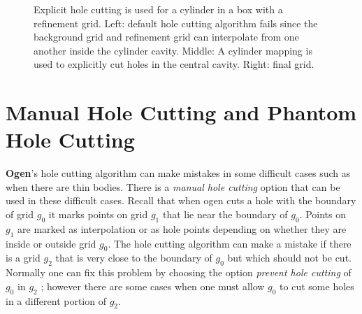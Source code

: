 \documentclass[xcolor=rgb,svgnames,dvipsnames]{article}
\newcommand{\figures}{\homeHenshaw/OvertureFigures}
\begin{document}
{
\newcommand{\figWidtha}{5cm}
\newcommand{\trimfiga}[2]{\trimPlot{#1}{#2}{.05}{.05}{.05}{.075}}
% 
\newcommand{\figWidthd}{6cm}
\newcommand{\trimfig}[2]{\trimPlot{#1}{#2}{.05}{.075}{.075}{.07}}
\begin{figure}[hbt]
\begin{center}
\end{center}
  \caption{Explicit hole cutting is used for a cylinder in a box with a refinement grid. Left: default hole cutting algorithm
      fails since the background grid and refinement grid can interpolate from one another inside the cylinder cavity. 
    Middle: A cylinder mapping is used to explicitly cut holes in the central cavity. Right: final grid.} 
 \label{fig:explicitHoleCuttingCylInBox}
\end{figure}
}




\clearpage
\section{Manual Hole Cutting and Phantom Hole Cutting}


  {\bf Ogen}'s hole cutting algorithm can make mistakes in some difficult cases such as when
there are thin bodies. There is a {\em manual hole cutting} option that can be used
in these difficult cases. Recall that when ogen cuts a hole with the boundary of grid $g_0$
it marks points on grid $g_1$ that lie near the boundary of $g_0$. Points on $g_1$ are marked as
interpolation or as hole points depending on whether they are inside or outside grid $g_0$.
The hole cutting algorithm can make a mistake if there is a grid $g_2$ that is very close to the 
boundary of $g_0$ but which should not be cut. Normally one can fix this problem by
choosing the option {\em prevent hole cutting} of $g_0$ in $g_2$ ; however there are some cases
when one must allow $g_0$ to cut some holes in a different portion of $g_2$.
\end{document}

